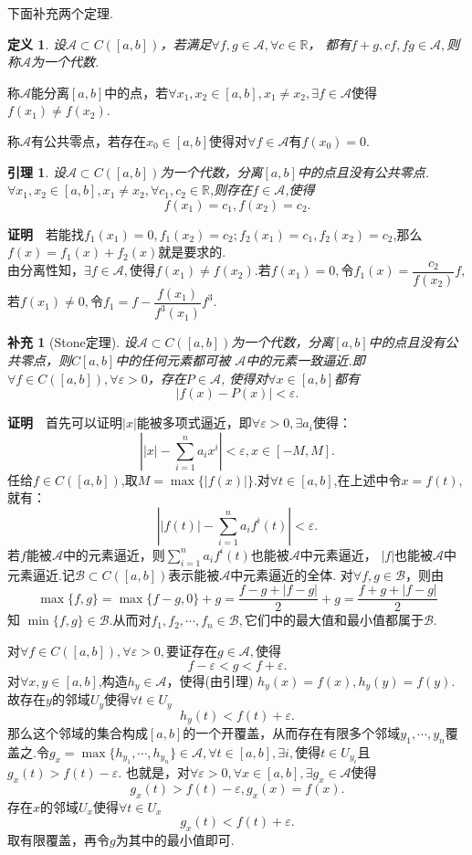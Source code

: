 \documentclass[UTF8]{article}
\newcommand{\R}{\mathbb{R}}
\newcommand{\zm}{\textbf{证明}$\quad$}
\newtheorem{lem}{\hspace{2em}引理}[section]
\newtheorem{dfn}{\hspace{2em}定义}[section]
\newtheorem{add}{\hspace{2em}补充}[section]
\begin{document}
  下面补充两个定理.
  \begin{dfn}
    设$\mathscr{A}\subset C([a,b])$，若满足$\forall f,g\in \mathscr{A},\forall c\in\R$，
    都有$f+g,cf,fg\in \mathscr{A},$则称$\mathscr{A}$为一个代数.
  \end{dfn}
  称$\mathscr{A}$能分离$[a,b]$中的点，若$\forall x_1,x_2\in[a,b],x_1\ne x_2,\exists f\in \mathscr{A}$使得
  $f(x_1)\ne f(x_2)$.

  称$\mathscr{A}$有公共零点，若存在$x_0\in[a,b]$使得对$\forall f\in \mathscr{A}$有$f(x_0)=0.$
  \begin{lem}
    设$\mathscr{A}\subset C([a,b])$为一个代数，分离$[a,b]$中的点且没有公共零点.
    $\forall x_1,x_2\in[a,b],x_1\ne x_2,\forall c_1,c_2\in\R$,则存在$f\in \mathscr{A}$,使得
    $$f(x_1)=c_1,f(x_2)=c_2.$$
  \end{lem}
  \zm 若能找$f_1(x_1)=0,f_1(x_2)=c_2;f_2(x_1)=c_1,f_2(x_2)=c_2$,那么$f(x)=f_1(x)+f_2(x)$就是要求的.\\
  由分离性知，$\exists f\in\mathscr{A},$使得$f(x_1)\ne f(x_2).$若$f(x_1)=0,$令$f_1(x)=
  \dfrac{c_2}{f(x_2)}f,$若$f(x_1)\ne0,$令$f_1=f-\dfrac{f(x_1)}{f^3(x_1)}f^3.$

  \begin{add}[Stone定理]
    设$\mathscr{A}\subset C([a,b])$为一个代数，分离$[a,b]$中的点且没有公共零点，则$C[a,b]$中的任何元素都可被
    $\mathscr{A}$中的元素一致逼近.即$\forall f\in C([a,b]),\forall \varepsilon>0$，存在$P\in\mathscr{A}$,
    使得对$\forall x\in[a,b]$都有
    $$\left|f(x)-P(x)\right|<\varepsilon.$$
  \end{add}
  \zm 首先可以证明$|x|$能被多项式逼近，即$\forall\varepsilon>0,\exists a_i$使得：
  $$\left||x|-\sum_{i=1}^na_ix^i\right|<\varepsilon,x\in[-M,M].$$
  任给$f\in C([a,b])$,取$M=\max\{|f(x)|\}$.对$\forall t\in[a,b]$,在上述中令$x=f(t),$就有：
  $$\left||f(t)|-\sum_{i=1}^na_if^i(t)\right|<\varepsilon.$$
  若$f$能被$\mathscr{A}$中的元素逼近，则$\sum_{i=1}^na_if^i(t)$也能被$\mathscr{A}$中元素逼近，
  $|f|$也能被$\mathscr{A}$中元素逼近.记$\mathscr{B}\subset C([a,b])$表示能被$\mathscr{A}$中元素逼近的全体.
  对$\forall f,g\in\mathscr{B}$，则由
  $$\max\{f,g\}=\max\{f-g,0\}+g=\frac{f-g+|f-g|}{2}+g=\frac{f+g+|f-g|}{2}$$知
  $\min\{f,g\}\in \mathscr{B}.$从而对$f_1,f_2,\cdots,f_n\in\mathscr{B},$它们中的最大值和最小值都属于$\mathscr{B}.$

  对$\forall f\in C([a,b]),\forall\varepsilon>0,$要证存在$g\in\mathscr{A},$使得
  $$f-\varepsilon<g<f+\varepsilon.$$
  对$\forall x,y\in[a,b]$,构造$h_y\in \mathscr{A}$，使得(由引理)
  $h_y(x)=f(x),h_y(y)=f(y).$故存在$y$的邻域$U_y$使得$\forall t\in U_y$
  $$h_y(t)<f(t)+\varepsilon.$$
  那么这个邻域的集合构成$[a,b]$的一个开覆盖，从而存在有限多个邻域$y_1,\cdots,y_n$覆盖之.令$g_x=\max\{
  h_{y_1},\cdots,h_{y_n}\}\in \mathscr{A},\forall t\in[a,b],\exists i,$使得$t\in U_{y_i}$且$g_x(t)>f(t)-\varepsilon.$
  也就是，对$\forall\varepsilon>0,\forall x\in[a,b],\exists g_x\in\mathscr{A}$使得
  $$g_x(t)>f(t)-\varepsilon,g_x(x)=f(x).$$
  存在$x$的邻域$U_x$使得$\forall t\in U_x$
  $$g_x(t)<f(t)+\varepsilon.$$
  取有限覆盖，再令$g$为其中的最小值即可.
\end{document}
